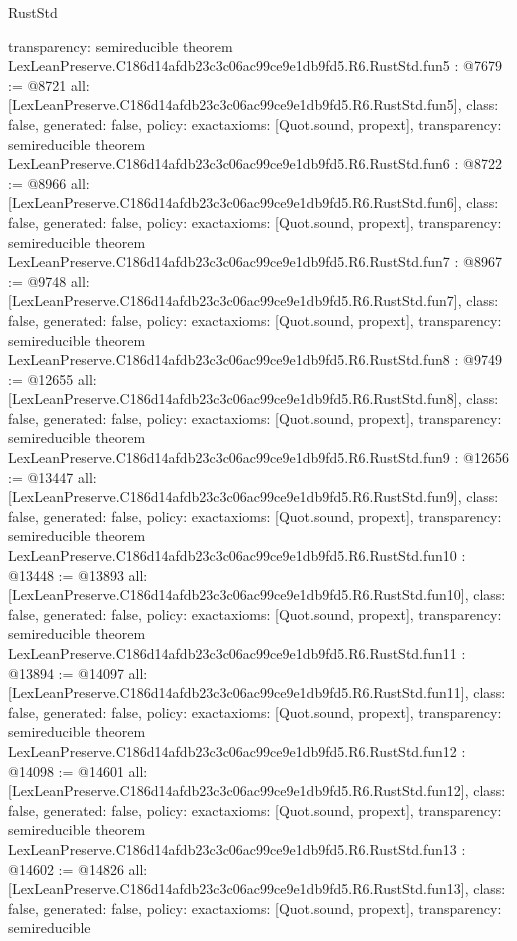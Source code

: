 \begin{lexlean}{RustStd}
\begin{coremodule}
{  transparency: semireducible
}
theorem LexLeanPreserve.C186d14afdb23c3c06ac99ce9e1db9fd5.R6.RustStd.fun5 : @7679 := @8721 {
  all: [LexLeanPreserve.C186d14afdb23c3c06ac99ce9e1db9fd5.R6.RustStd.fun5],
  class: false,
  generated: false,
  policy: exact{axioms: [Quot.sound, propext]},
  transparency: semireducible
}
theorem LexLeanPreserve.C186d14afdb23c3c06ac99ce9e1db9fd5.R6.RustStd.fun6 : @8722 := @8966 {
  all: [LexLeanPreserve.C186d14afdb23c3c06ac99ce9e1db9fd5.R6.RustStd.fun6],
  class: false,
  generated: false,
  policy: exact{axioms: [Quot.sound, propext]},
  transparency: semireducible
}
theorem LexLeanPreserve.C186d14afdb23c3c06ac99ce9e1db9fd5.R6.RustStd.fun7 : @8967 := @9748 {
  all: [LexLeanPreserve.C186d14afdb23c3c06ac99ce9e1db9fd5.R6.RustStd.fun7],
  class: false,
  generated: false,
  policy: exact{axioms: [Quot.sound, propext]},
  transparency: semireducible
}
theorem LexLeanPreserve.C186d14afdb23c3c06ac99ce9e1db9fd5.R6.RustStd.fun8 : @9749 := @12655 {
  all: [LexLeanPreserve.C186d14afdb23c3c06ac99ce9e1db9fd5.R6.RustStd.fun8],
  class: false,
  generated: false,
  policy: exact{axioms: [Quot.sound, propext]},
  transparency: semireducible
}
theorem LexLeanPreserve.C186d14afdb23c3c06ac99ce9e1db9fd5.R6.RustStd.fun9 : @12656 := @13447 {
  all: [LexLeanPreserve.C186d14afdb23c3c06ac99ce9e1db9fd5.R6.RustStd.fun9],
  class: false,
  generated: false,
  policy: exact{axioms: [Quot.sound, propext]},
  transparency: semireducible
}
theorem LexLeanPreserve.C186d14afdb23c3c06ac99ce9e1db9fd5.R6.RustStd.fun10 : @13448 := @13893 {
  all: [LexLeanPreserve.C186d14afdb23c3c06ac99ce9e1db9fd5.R6.RustStd.fun10],
  class: false,
  generated: false,
  policy: exact{axioms: [Quot.sound, propext]},
  transparency: semireducible
}
theorem LexLeanPreserve.C186d14afdb23c3c06ac99ce9e1db9fd5.R6.RustStd.fun11 : @13894 := @14097 {
  all: [LexLeanPreserve.C186d14afdb23c3c06ac99ce9e1db9fd5.R6.RustStd.fun11],
  class: false,
  generated: false,
  policy: exact{axioms: [Quot.sound, propext]},
  transparency: semireducible
}
theorem LexLeanPreserve.C186d14afdb23c3c06ac99ce9e1db9fd5.R6.RustStd.fun12 : @14098 := @14601 {
  all: [LexLeanPreserve.C186d14afdb23c3c06ac99ce9e1db9fd5.R6.RustStd.fun12],
  class: false,
  generated: false,
  policy: exact{axioms: [Quot.sound, propext]},
  transparency: semireducible
}
theorem LexLeanPreserve.C186d14afdb23c3c06ac99ce9e1db9fd5.R6.RustStd.fun13 : @14602 := @14826 {
  all: [LexLeanPreserve.C186d14afdb23c3c06ac99ce9e1db9fd5.R6.RustStd.fun13],
  class: false,
  generated: false,
  policy: exact{axioms: [Quot.sound, propext]},
  transparency: semireducible
}
\end{coremodule}
\end{lexlean}

